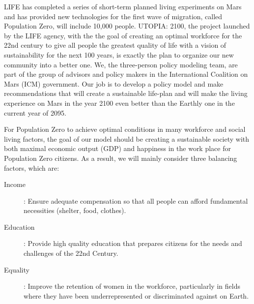 LIFE has completed a series of short-term planned living experiments on Mars and has provided new technologies for the first wave of migration, called Population Zero, will include 10,000 people. UTOPIA: 2100, the project launched by the LIFE agency, with the the goal of creating an optimal workforce for the 22nd century to give all people the greatest quality of life with a vision of sustainability for the next 100 years, is exactly the plan to organize our new community into a better one. We, the three-person policy modeling team, are part of the group of advisors and policy makers in the International Coalition on Mars (ICM) government. Our job is to develop a policy model and make recommendations that will create a sustainable life-plan and will make the living experience on Mars in the year 2100 even better than the Earthly one in the current year of 2095.

For Population Zero to achieve optimal conditions in many workforce and social living factors, the goal of our model should be creating a sustainable society with both maximal economic output (GDP) and happiness in the work place for Population Zero citizens. As a result, we will mainly consider three balancing factors, which are:
\begin{description}
\item [Income]: Ensure adequate compensation so that all people can afford fundamental necessities (shelter, food, clothes).
\item [Education]: Provide high quality education that prepares citizens for the needs and challenges of the 22nd Century.
\item [Equality]: Improve the retention of women in the workforce, particularly in fields where they have been underrepresented or discriminated against on Earth.
\end{description}